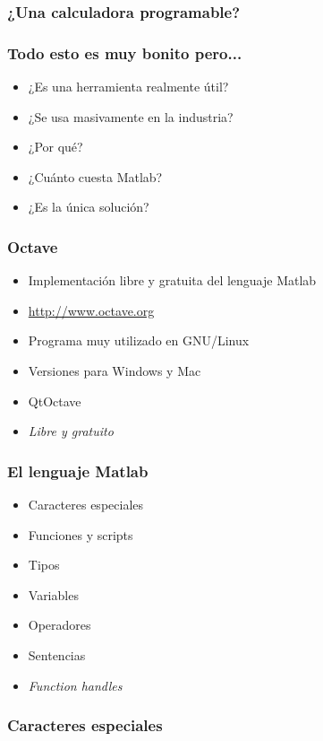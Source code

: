 \documentclass[12pt]{beamer}
\begin{document}
\begin{large}

\begin{frame}
  \frametitle{¿Una calculadora programable?}
  \testcode
\end{frame}

\begin{frame}
  \frametitle{Todo esto es muy bonito pero...}
  \begin{itemize}
    \item ¿Es una herramienta realmente útil?
    \item ¿Se usa masivamente en la industria?
    \item ¿Por qué?
    \item ¿Cuánto cuesta Matlab?
    \item ¿Es la única solución?
  \end{itemize}
\end{frame}

\begin{frame}
  \frametitle{Octave}
  \begin{itemize}
    \item Implementación libre y gratuita del lenguaje Matlab
    \item \url{http://www.octave.org}
    \item Programa muy utilizado en GNU/Linux
    \item Versiones para Windows y Mac
    \item QtOctave
    \item \emph{Libre y gratuito}
  \end{itemize}
\end{frame}

\begin{frame}
  \frametitle{El lenguaje Matlab}
  \begin{itemize}
    \item Caracteres especiales
    \item Funciones y scripts
    \item Tipos
    \item Variables
    \item Operadores
    \item Sentencias
    \item \emph{Function handles}
  \end{itemize}
\end{frame}


\begin{frame}
\frametitle{Caracteres especiales}
\testcode
\end{frame}

\end{large}
\end{document}
